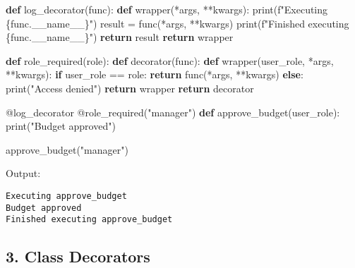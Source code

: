 \documentclass[
  letterpaper,
  DIV=11,
  numbers=noendperiod]{scrreprt}
\newenvironment{Shaded}{\begin{snugshade}}{\end{snugshade}}
\newcommand{\AttributeTok}[1]{\textcolor[rgb]{0.40,0.45,0.13}{#1}}
\newcommand{\BuiltInTok}[1]{\textcolor[rgb]{0.00,0.23,0.31}{#1}}
\newcommand{\ControlFlowTok}[1]{\textcolor[rgb]{0.00,0.23,0.31}{\textbf{#1}}}
\newcommand{\KeywordTok}[1]{\textcolor[rgb]{0.00,0.23,0.31}{\textbf{#1}}}
\newcommand{\NormalTok}[1]{\textcolor[rgb]{0.00,0.23,0.31}{#1}}
\newcommand{\OperatorTok}[1]{\textcolor[rgb]{0.37,0.37,0.37}{#1}}
\newcommand{\SpecialCharTok}[1]{\textcolor[rgb]{0.37,0.37,0.37}{#1}}
\newcommand{\SpecialStringTok}[1]{\textcolor[rgb]{0.13,0.47,0.30}{#1}}
\newcommand{\StringTok}[1]{\textcolor[rgb]{0.13,0.47,0.30}{#1}}
\newcommand{\VariableTok}[1]{\textcolor[rgb]{0.07,0.07,0.07}{#1}}
\begin{document}
\begin{Shaded}
\begin{Highlighting}[]
\KeywordTok{def}\NormalTok{ log\_decorator(func):}
    \KeywordTok{def}\NormalTok{ wrapper(}\OperatorTok{*}\NormalTok{args, }\OperatorTok{**}\NormalTok{kwargs):}
        \BuiltInTok{print}\NormalTok{(}\SpecialStringTok{f"Executing }\SpecialCharTok{\{}\NormalTok{func}\SpecialCharTok{.}\VariableTok{\_\_name\_\_}\SpecialCharTok{\}}\SpecialStringTok{"}\NormalTok{)}
\NormalTok{        result }\OperatorTok{=}\NormalTok{ func(}\OperatorTok{*}\NormalTok{args, }\OperatorTok{**}\NormalTok{kwargs)}
        \BuiltInTok{print}\NormalTok{(}\SpecialStringTok{f"Finished executing }\SpecialCharTok{\{}\NormalTok{func}\SpecialCharTok{.}\VariableTok{\_\_name\_\_}\SpecialCharTok{\}}\SpecialStringTok{"}\NormalTok{)}
        \ControlFlowTok{return}\NormalTok{ result}
    \ControlFlowTok{return}\NormalTok{ wrapper}

\KeywordTok{def}\NormalTok{ role\_required(role):}
    \KeywordTok{def}\NormalTok{ decorator(func):}
        \KeywordTok{def}\NormalTok{ wrapper(user\_role, }\OperatorTok{*}\NormalTok{args, }\OperatorTok{**}\NormalTok{kwargs):}
            \ControlFlowTok{if}\NormalTok{ user\_role }\OperatorTok{==}\NormalTok{ role:}
                \ControlFlowTok{return}\NormalTok{ func(}\OperatorTok{*}\NormalTok{args, }\OperatorTok{**}\NormalTok{kwargs)}
            \ControlFlowTok{else}\NormalTok{:}
                \BuiltInTok{print}\NormalTok{(}\StringTok{"Access denied"}\NormalTok{)}
        \ControlFlowTok{return}\NormalTok{ wrapper}
    \ControlFlowTok{return}\NormalTok{ decorator}

\AttributeTok{@log\_decorator}
\AttributeTok{@role\_required}\NormalTok{(}\StringTok{"manager"}\NormalTok{)}
\KeywordTok{def}\NormalTok{ approve\_budget(user\_role):}
    \BuiltInTok{print}\NormalTok{(}\StringTok{"Budget approved"}\NormalTok{)}

\NormalTok{approve\_budget(}\StringTok{"manager"}\NormalTok{)}
\end{Highlighting}
\end{Shaded}

Output:

\begin{verbatim}
Executing approve_budget
Budget approved
Finished executing approve_budget
\end{verbatim}

\subsection{3. Class Decorators}\label{class-decorators}
\end{document}
